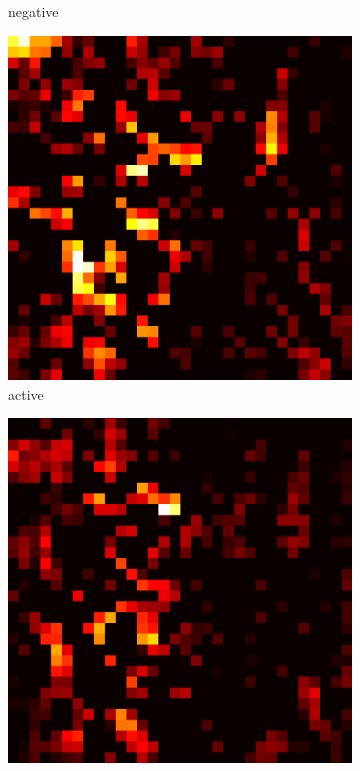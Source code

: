 \documentclass[preprint,12pt]{elsarticle}
\begin{document}
\begin{figure}
\begin{subfigure}{0.14\textwidth}
        \caption{negative}
    \end{subfigure}
    \hfill
    \begin{subfigure}{0.14\textwidth}
        \centering
        \includegraphics[width=\linewidth]{../visualizations/examples/cifar10/cnn/active_saliency_map/2.png}
        \caption{active}
    \end{subfigure}
    \hfill
    \begin{subfigure}{0.14\textwidth}
        \centering
        \includegraphics[width=\linewidth]{../visualizations/examples/cifar10/cnn/inactive_saliency_map/2.png}

\end{subfigure}
\end{figure}
\end{document}

